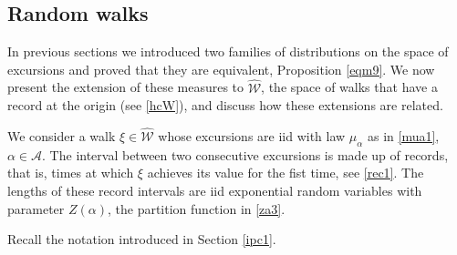 \documentclass[12pt]{article}
\numberwithin{equation}{section}
\newcommand{\cW}{\mathcal W}
\newcommand{\hcW}{\widehat{\cW}}
\begin{document}
\subsection{Random walks}
\label{ss32}

In previous sections we introduced two families of distributions on the space of excursions and proved that they are equivalent, Proposition \ref{eqm9}. We now present the extension of these measures to $\hcW$, the space of walks that have a record at the origin (see \eqref{hcW}), and discuss how these extensions are related.

We consider a walk $\xi\in \hcW$ whose excursions are iid with law $\mu_\alpha$ as in \eqref{mua1}, $\alpha \in \mathcal A$. The interval between two consecutive excursions is made up of records, that is, times at which $\xi$ achieves its value for the fist time, see \eqref{rec1}. The lengths of these record intervals are iid exponential random variables with parameter $Z(\alpha)$, the partition function in \eqref{za3}.

Recall the notation introduced in Section \ref{ipc1}. 
\end{document}
